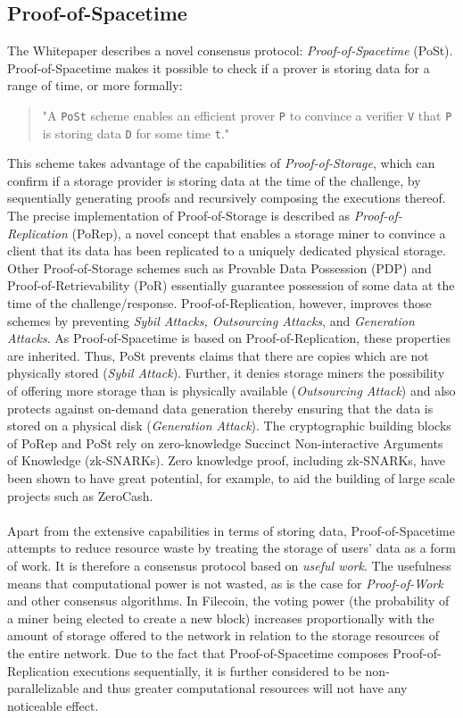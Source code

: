 \documentclass[conference]{IEEEtran}
\begin{document}
\subsection{Proof-of-Spacetime}
\label{subsec:pos}
The Whitepaper\cite{filecoin} describes a novel consensus protocol: \textit{Proof-of-Spacetime} (PoSt).
Proof-of-Spacetime makes it possible to check if a prover is storing data for a range of time, or more formally:
\begin{quotation}
"A \texttt{PoSt} scheme enables an efficient prover \texttt{P} to convince a verifier \texttt{V} that \texttt{P} is storing data \texttt{D} for some time \texttt{t}."\cite{filecoin}
\end{quotation}
This scheme takes advantage of the capabilities of \textit{Proof-of-Storage}\cite{proof-storage}, which can confirm if a storage provider is storing data at the time of the challenge, by sequentially generating proofs and recursively composing the executions thereof.
The precise implementation of Proof-of-Storage is described as \textit{Proof-of-Replication} (PoRep), a novel concept that enables a storage miner to convince a client that its data has been replicated to a uniquely dedicated physical storage.
Other Proof-of-Storage schemes such as Provable Data Possession (PDP)\cite{proof-possession} and Proof-of-Retrievability (PoR)\cite{proof-retrievability} essentially guarantee possession of some data at the time of the challenge/response.
Proof-of-Replication, however, improves those schemes by preventing \textit{Sybil Attacks, Outsourcing Attacks}, and \textit{Generation Attacks}.
As Proof-of-Spacetime is based on Proof-of-Replication, these properties are inherited.
Thus, PoSt prevents claims that there are copies which are not physically stored (\textit{Sybil Attack}).
Further, it denies storage miners the possibility of offering more storage than is physically available (\textit{Outsourcing Attack}) and also protects against on-demand data generation thereby ensuring that the data is stored on a physical disk (\textit{Generation Attack}).
The cryptographic building blocks of PoRep and PoSt rely on zero-knowledge Succinct Non-interactive Arguments of Knowledge (zk-SNARKs).
Zero knowledge proof, including zk-SNARKs, have been shown to have great potential, for example, to aid the building of large scale projects such as ZeroCash\cite{zcash}. 
\\
\\
Apart from the extensive capabilities in terms of storing data, Proof-of-Spacetime attempts to reduce resource waste by treating the storage of users' data as a form of work.
It is therefore a consensus protocol based on \textit{useful work}.
The usefulness means that computational power is not wasted, as is the case for \textit{Proof-of-Work}\cite{bitcoin} and other consensus algorithms.
In Filecoin, the voting power (the probability of a miner being elected to create a new block) increases proportionally with the amount of storage offered to the network in relation to the storage resources of the entire network.
Due to the fact that Proof-of-Spacetime composes Proof-of-Replication executions sequentially, it is further considered to be non-parallelizable and thus greater computational resources will not have any noticeable effect. \cite{filecoin}
\end{document}
